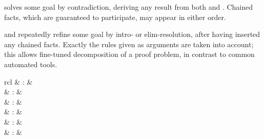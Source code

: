 \begin{isabellebody}
\begin{isamarkuptext}
\begin{description}
  \item \hyperlink{method.contradiction}{\mbox{}} solves some goal by contradiction,
  deriving any result from both  and .  Chained
  facts, which are guaranteed to participate, may appear in either
  order.

  \item \hyperlink{method.intro}{\mbox{}} and \hyperlink{method.elim}{\mbox{}} repeatedly refine some goal
  by intro- or elim-resolution, after having inserted any chained
  facts.  Exactly the rules given as arguments are taken into account;
  this allows fine-tuned decomposition of a proof problem, in contrast
  to common automated tools.

  \end{description}%
\end{isamarkuptext}%
\isamarkuptrue%
%
\isamarkuptrue%
%
\begin{isamarkuptext}%
\begin{matharray}{rcl}
    \hypertarget{method.blast}{\hyperlink{method.blast}{\mbox{}}} & : &  \\
    \hypertarget{method.fast}{\hyperlink{method.fast}{\mbox{}}} & : &  \\
    \hypertarget{method.slow}{\hyperlink{method.slow}{\mbox{}}} & : &  \\
    \hypertarget{method.best}{\hyperlink{method.best}{\mbox{}}} & : &  \\
    \hypertarget{method.safe}{\hyperlink{method.safe}{\mbox{}}} & : &  \\
    \hypertarget{method.clarify}{\hyperlink{method.clarify}{\mbox{}}} & : &  \\
  \end{matharray}


\end{isamarkuptext}
\end{isabellebody}
